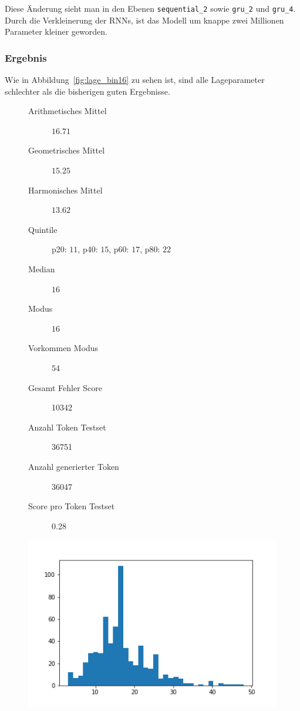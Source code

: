 \documentclass[pdftex,a4paper,halfparskip, article]{scrartcl}
\begin{document}
Diese Änderung sieht man in den Ebenen \texttt{sequential\_2} sowie \texttt{gru\_2} und \texttt{gru\_4}.
Durch die Verkleinerung der RNNs, ist das Modell um knappe zwei Millionen Parameter kleiner geworden.

\subsubsection*{Ergebnis}


Wie in Abbildung~\ref{fig:lage_bin16} zu sehen ist, sind alle Lageparameter schlechter als die bisherigen guten Ergebnisse.

\begin{figure}
\centering
\begin{minipage}{.5\textwidth}
  \centering
  \begin{description}
	\item[Arithmetisches Mittel] $16.71$	
	\item[Geometrisches Mittel] $15.25$
	\item[Harmonisches Mittel] $13.62$
	\item[Quintile] p20: $11$, p40: $15$, p60: $17$, p80: $22$
	\item[Median] $16$
	\item[Modus] $16$
	\item[Vorkommen Modus] $54$
	\item[Gesamt Fehler Score] 10342
	\item[Anzahl Token Testset] 36751 
	\item[Anzahl generierter Token] 36047
	\item[Score pro Token Testset]  0.28
\end{description}
  \label{fig:lage_bin16}
\end{minipage}%
\begin{minipage}{.5\textwidth}
  \centering
  \includegraphics[width=1\linewidth]{predictions_bin16_histogramm}
  \label{fig:hist_bin16}
\end{minipage}
\end{figure}
\end{document}

